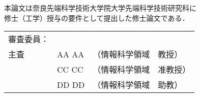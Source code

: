 \renewcommand\thepage{Title2}
\thispagestyle{empty}
\vspace*{8truecm}
\begin{center}
本論文は奈良先端科学技術大学院大学先端科学技術研究科に$\ $ \\
修士（工学）授与の要件として提出した修士論文である．

 \bigskip

 \jauthor
 \vspace*{0.4truecm}
 \begin{table}[h]
 \begin{center}
	\begin{tabular}[t]{lll}
	 審査委員：&             & \\
     主査      & AA AA   & （情報科学領域　教授） \\
	           & CC CC   & （情報科学領域　准教授） \\
               & DD DD & （情報科学領域　助教） \\
	\end{tabular}
 \end{center}
 \end{table}
 \end{center}
